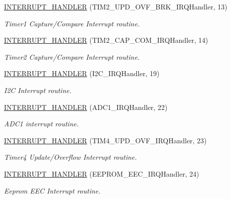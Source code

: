 \begin{DoxyCompactItemize}
\hyperlink{group___u_a_r_t1___printf_ga2cee36445f8fbd01953f0d51065fcdca}{I\+N\+T\+E\+R\+R\+U\+P\+T\+\_\+\+H\+A\+N\+D\+L\+ER} (T\+I\+M2\+\_\+\+U\+P\+D\+\_\+\+O\+V\+F\+\_\+\+B\+R\+K\+\_\+\+I\+R\+Q\+Handler, 13)
\begin{DoxyCompactList}\small\item\em Timer1 Capture/\+Compare Interrupt routine. \end{DoxyCompactList}\item 
\hyperlink{group___u_a_r_t1___printf_gad0ff5a598eb3e67db7e293f84c5f5de2}{I\+N\+T\+E\+R\+R\+U\+P\+T\+\_\+\+H\+A\+N\+D\+L\+ER} (T\+I\+M2\+\_\+\+C\+A\+P\+\_\+\+C\+O\+M\+\_\+\+I\+R\+Q\+Handler, 14)
\begin{DoxyCompactList}\small\item\em Timer2 Capture/\+Compare Interrupt routine. \end{DoxyCompactList}\item 
\hyperlink{group___u_a_r_t1___printf_gaa0c4617be080ece605564afc0f39580e}{I\+N\+T\+E\+R\+R\+U\+P\+T\+\_\+\+H\+A\+N\+D\+L\+ER} (I2\+C\+\_\+\+I\+R\+Q\+Handler, 19)
\begin{DoxyCompactList}\small\item\em I2C Interrupt routine. \end{DoxyCompactList}\item 
\hyperlink{group___u_a_r_t1___printf_gae9ad4b05b79663cbb95b8fffadd7ece4}{I\+N\+T\+E\+R\+R\+U\+P\+T\+\_\+\+H\+A\+N\+D\+L\+ER} (A\+D\+C1\+\_\+\+I\+R\+Q\+Handler, 22)
\begin{DoxyCompactList}\small\item\em A\+D\+C1 interrupt routine. \end{DoxyCompactList}\item 
\hyperlink{group___u_a_r_t1___printf_ga7c6573228cfa8de176b2a10d78339bb8}{I\+N\+T\+E\+R\+R\+U\+P\+T\+\_\+\+H\+A\+N\+D\+L\+ER} (T\+I\+M4\+\_\+\+U\+P\+D\+\_\+\+O\+V\+F\+\_\+\+I\+R\+Q\+Handler, 23)
\begin{DoxyCompactList}\small\item\em Timer4 Update/\+Overflow Interrupt routine. \end{DoxyCompactList}\item 
\hyperlink{group___u_a_r_t1___printf_gaa1669e6e98832673b9affbe3fc1424e0}{I\+N\+T\+E\+R\+R\+U\+P\+T\+\_\+\+H\+A\+N\+D\+L\+ER} (E\+E\+P\+R\+O\+M\+\_\+\+E\+E\+C\+\_\+\+I\+R\+Q\+Handler, 24)
\begin{DoxyCompactList}\small\item\em Eeprom E\+EC Interrupt routine. \end{DoxyCompactList}\end{DoxyCompactItemize}


